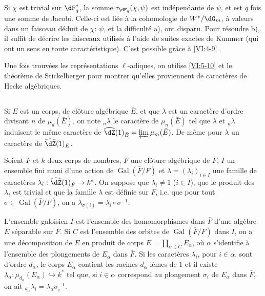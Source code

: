 \documentclass[oneside]{book}
\DeclareMathOperator{\gal}{Gal}
\theoremstyle{sga-source}
\theoremstyle{sga-source-dash}
\theoremstyle{sga-source-dotdash}
\theoremstyle{sga-source-number-note-dash}
\theoremstyle{sga-source-note-number-dotdash}
\theoremstyle{sga-source-example-dotdash}
\theoremstyle{sga-source-inline-number}
\theoremstyle{sga-source-bare-number}
\theoremstyle{sga-source}
\newcommand{\PrintPage}[1]{}\newcommand{\MathPage}[1]{}\newcommand{\PrintCite}[2]{#1}\newcommand{\var}[3]{#2}
\begin{document}
Si $\chi$ est trivial sur $\dF_q^\ast$, la somme $\tau_{\dF_q}(\chi,\psi)$ 
est indépendante de $\psi$, et est $q$ fois une somme de Jacobi. Celle-ci est 
liée à la cohomologie de $W^\ast/\dG_m$, à valeurs dans un faisceau 
déduit de $\chi$: $\psi$, et la difficulté a), ont disparu. Pour 
résoudre b), il suffit de décrire les faisceaux utilisés à l'aide de 
suites exactes de \var{K\"ummer}{Kummer}{S45-SOL-0889} (qui ont un sens en toute caractéristique). C'est 
possible gr\^ace à \ref{VI:4-9}. 

Une fois trouvées les représentations $\ell$-adiques, on utilise 
\ref{VI:5-10} et le théorème de Stickelberger pour montrer qu'elles 
proviennent de caractères de Hecke algébriques. 





\subsection{}\label{VI:6-1}

Si $E$ est un corps, de clôture algébrique $\bar E$, et que $\lambda$ est 
un caractère d'ordre divisant $n$ de $\mu_d(\bar E)$, on note $_n\lambda$ le 
caractère de $\mu_n(\bar E)$ tel que $\lambda$ et $_n \lambda$ induisent le 
même caractère de $\widehat\dZ(1)_{\bar E} = \varprojlim \mu_m(\bar E)$. De 
même pour $\lambda$ un caractère de $\widehat\dZ(1)_{\bar E}$. 

Soient $F$ et $k$ deux corps de nombres, $\bar F$ une clôture algébrique de 
$F$, $I$ un ensemble fini muni d'une action de $\gal(\bar F/F)$ et 
$\lambda=(\lambda_i)_{i\in I}$ une famille de caractères 
$\lambda_i:\widehat\dZ(1)_{\bar F} \to k^\ast$. On suppose que 
$\lambda_i\ne 1$ ($i\in I$), que \PrintPage{214}
le produit des $\lambda_i$ est trivial et que 
\var{la famille $\lambda$ est défini}{la famille $\lambda$ est définie}{S45-SOL-0892} sur $F$, i.e. que pour tout 
$\sigma\in \gal(\bar F/F)$, on a 
$\lambda_{\sigma(i)}=\lambda_i\circ \sigma^{-1}$. 

L'ensemble galoisien $I$ est \var{l'ensemble des homomorphisme dans}{l'ensemble des homomorphismes dans}{S45-SOL-0893} $\bar F$ d'une 
alg\`ebre $E$ séparable sur $F$. Si $C$ est l'ensemble des orbites de 
$\gal(\bar F/F)$ dans $I$, on a une décomposition de $E$ en produit de corps 
$E=\prod_{\alpha\in C} E_\alpha$, où $\alpha$ s'identifie à l'ensemble des 
plongements de $E_\alpha$ dans $\bar F$. Si les caractères $\lambda_i$, pour 
$i\in \alpha$, sont d'ordre $d_\alpha$, le corps $E_\alpha$ contient les 
racines $d_\alpha$-ièmes de $1$ et il existe 
$\lambda_\alpha:\mu_{d_\alpha}(E_\alpha) \hookrightarrow k^\ast$  tel que, si 
$i\in \alpha$ correspond au plongement $\sigma_i$ de $E_\alpha$ dans $\bar F$, 
on ait $_{d_\alpha} \lambda_i = \lambda_\alpha \sigma_i^{-1}$. 
\end{document}
